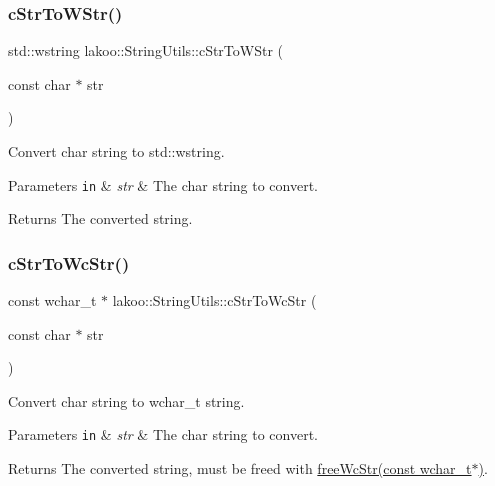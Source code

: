 \subsubsection{\texorpdfstring{c\+Str\+To\+W\+Str()}{cStrToWStr()}}
{\footnotesize\ttfamily std\+::wstring lakoo\+::\+String\+Utils\+::c\+Str\+To\+W\+Str (\begin{DoxyParamCaption}\item[{const char $\ast$}]{str }\end{DoxyParamCaption})}



Convert char string to std\+::wstring. 


\begin{DoxyParams}[1]{Parameters}
\mbox{\tt in}  & {\em str} & The char string to convert. \\
\hline
\end{DoxyParams}
\begin{DoxyReturn}{Returns}
The converted string. 
\end{DoxyReturn}
\mbox{\label{namespacelakoo_1_1_string_utils_aea1ebb73b8aa4f817d1473900cf16c29}} 
\subsubsection{\texorpdfstring{c\+Str\+To\+Wc\+Str()}{cStrToWcStr()}}
{\footnotesize\ttfamily const wchar\+\_\+t $\ast$ lakoo\+::\+String\+Utils\+::c\+Str\+To\+Wc\+Str (\begin{DoxyParamCaption}\item[{const char $\ast$}]{str }\end{DoxyParamCaption})}



Convert char string to wchar\+\_\+t string. 


\begin{DoxyParams}[1]{Parameters}
\mbox{\tt in}  & {\em str} & The char string to convert. \\
\hline
\end{DoxyParams}
\begin{DoxyReturn}{Returns}
The converted string, must be freed with \hyperlink{namespacelakoo_1_1_string_utils_a84da50c47fed24d0b4a467b84c5e2c7d}{free\+Wc\+Str(const wchar\+\_\+t$\ast$)}. 
\end{DoxyReturn}
\mbox{\label{namespacelakoo_1_1_string_utils_a84da50c47fed24d0b4a467b84c5e2c7d}} 
